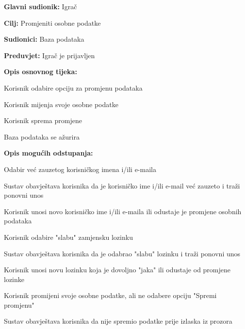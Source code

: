					\noindent {}
					\begin{packed_item}
					
					\item \textbf{Glavni sudionik: }Igrač
					\item  \textbf{Cilj:} Promjeniti osobne podatke
					\item  \textbf{Sudionici:} Baza podataka
					\item  \textbf{Preduvjet:} Igrač je prijavljen
					\item  \textbf{Opis osnovnog tijeka:}
					
					\item[] \begin{packed_enum}
						
						\item Korisnik odabire opciju za promjenu podataka
						\item Korisnik mijenja svoje osobne podatke
						\item Korisnik sprema promjene
						\item Baza podataka se ažurira
					\end{packed_enum}
					
					\item  \textbf{Opis mogućih odstupanja:}
					
					\item[] \begin{packed_item}
						
						\item[2.a] Odabir već zauzetog korisničkog imena i/ili e-maila
						\item[] \begin{packed_enum}
							
							\item Sustav obavještava korisnika da je korisničko ime i/ili e-mail već zauzeto i traži ponovni unos
							\item Korisnik unosi novo korisničko ime i/ili e-maila ili odustaje je promjene osobnih podataka
							
						\end{packed_enum}
						\item[2.b] Korisnik odabire "slabu" zamjensku lozinku
						\item[] \begin{packed_enum}
							\item Sustav obavještava korisnika da je odabrao "slabu" lozinku i traži ponovni unos
							\item Korisnik unosi novu lozinku koja je dovoljno "jaka" ili odustaje od promjene lozinke
						\end{packed_enum}
						\item[2.c] Korisnik promijeni svoje osobne podatke, ali ne odabere opciju "Spremi promjenu"
						\item[] \begin{packed_enum}
							\item Sustav obavještava korisnika da nije spremio podatke prije izlaska iz prozora
						\end{packed_enum}
						

\end{packed_item}
\end{packed_item}
